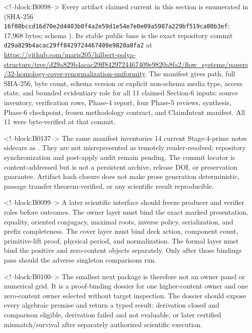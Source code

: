 \documentclass[11pt]{article}
\begin{document}
<!--block:B0098-->
Every artifact claimed current in this section is enumerated in
 (SHA-256
\texttt{16f08bcc\allowbreak{}d16d70e2\allowbreak{}d4403b0f\allowbreak{}4a2e59d1\allowbreak{}e54e7e0e\allowbreak{}09a5987a\allowbreak{}229bf519\allowbreak{}ca00b3ef}; 17,968 bytes; schema
).  Its stable public
base is the exact repository commit
\texttt{d29a829b4acac29ff8429724467409e9820a8fa2} at
\url{https://github.com/maris205/hilbert-polya-structure/tree/d29a829b4acac29ff8429724467409e9820a8fa2/flow_systems/papers/32-homology-cover-renormalization-uniformity}.
The manifest gives path, full SHA-256, byte count, schema version or explicit
non-schema media type, access state, and bounded evidentiary role for all 11
claimed Section-6 inputs: source inventory, verification rows, Phase-4 report,
four Phase-5 reviews, synthesis, Phase-6 checkpoint, frozen methodology
contract, and ClaimIntent manifest.  All 11 were byte-verified at that commit.

<!--block:B0137-->
The same manifest inventories 14 current Stage-4-prime notes sidecars as
.  They are
not misrepresented as remotely reader-resolved; repository synchronization and
post-apply audit remain pending.  The commit locator is content-addressed but is
not a persistent archive, release DOI, or preservation guarantee.  Artifact
hash closure does not make prose generation deterministic, passage transfer
theorem-verified, or any scientific result reproducible.

<!--block:B0099-->
A later scientific interface should freeze producer and verifier roles
before outcomes. The owner layer must bind the exact marked
presentation, equality, oriented conjugacy, maximal roots, inverse
policy, serialization, and prefix completeness. The cover layer must
bind deck action, component count, primitive-lift proof, physical
period, and normalization. The formal layer must bind the positive and
zero-content objects separately. Only after those bindings pass should
the adverse singleton comparisons run.

<!--block:B0100-->
The smallest next package is therefore not an owner panel or numerical
grid. It is a proof-binding dossier for one higher-content owner and one
zero-content owner selected without target inspection. The dossier
should expose every algebraic premise and return a typed result:
derivation closed and comparison eligible, derivation failed and not
evaluable, or later certified mismatch/survival after separately
authorized scientific execution.
\end{document}
